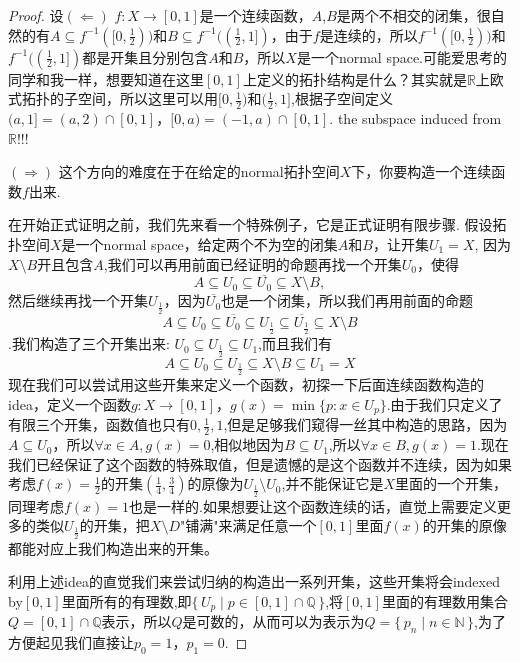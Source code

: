 \documentclass{article}
\newcommand*{\xfunc}[4]{{#2}\colon{#3}{#1}{#4}}
\newcommand*{\func}[3]{\xfunc{\to}{#1}{#2}{#3}}
\newcommand\Set[2]{\{\,#1\mid#2\,\}} %
\begin{document}
\begin{proof}
设$(\Leftarrow)$ $\func{f}{X}{[0,1]}$是一个连续函数，$A$,$B$是两个不相交的闭集，很自然的有$A \subseteq f^{-1}([0,\frac{1}{2}))$和$B \subseteq f^{-1}((\frac{1}{2},1])$，由于$f$是连续的，所以$f^{-1}([0,\frac{1}{2}))$和$f^{-1}((\frac{1}{2},1])$都是开集且分别包含$A$和$B$，所以$X$是一个normal space.可能爱思考的同学和我一样，想要知道在这里$[0,1]$上定义的拓扑结构是什么？其实就是$\mathbb{R}$上欧式拓扑的子空间，所以这里可以用$[0,\frac{1}{2})$和$(\frac{1}{2},1]$,根据子空间定义$(a,1]=(a,2)\cap[0,1]$，$[0,a)=(−1,a)∩[0,1]$. the subspace induced from $\mathbb{R}$!!! 

$(\Rightarrow)$ 这个方向的难度在于在给定的normal拓扑空间$X$下，你要构造一个连续函数$f$出来.

在开始正式证明之前，我们先来看一个特殊例子，它是正式证明有限步骤. 假设拓扑空间$X$是一个normal space，给定两个不为空的闭集$A$和$B$，让开集$U_1 = X$, 因为$X \setminus B$开且包含$A$,我们可以再用前面已经证明的命题再找一个开集$U_0$，使得\[A \subseteq U_0 \subseteq \overline{U_0} \subseteq X \setminus B,\]然后继续再找一个开集$U_{\frac{1}{2}}$，因为$\overline{U_0}$也是一个闭集，所以我们再用前面的命题\[A \subseteq U_0 \subseteq \overline{U_0} \subseteq U_{\frac{1}{2}} \subseteq \overline{U_{\frac{1}{2}}} \subseteq X \setminus B\].我们构造了三个开集出来: $U_0 \subseteq U_{\frac{1}{2}} \subseteq U_1$,而且我们有\[A \subseteq U_0 \subseteq U_{\frac{1}{2}} \subseteq X \setminus B \subseteq U_1 =X \]现在我们可以尝试用这些开集来定义一个函数，初探一下后面连续函数构造的idea，定义一个函数$\func{g}{X}{[0,1]}$，$g(x)=\min\{p \colon x \in U_p\}$.由于我们只定义了有限三个开集，函数值也只有$0,\frac{1}{2},1$,但是足够我们窥得一丝其中构造的思路，因为$A \subseteq U_0$，所以$\forall x \in A,g(x)=0$,相似地因为$B \subseteq U_1$,所以$\forall x \in B,g(x)=1$.现在我们已经保证了这个函数的特殊取值，但是遗憾的是这个函数并不连续，因为如果考虑$f(x)=\frac{1}{2}$的开集$(\frac{1}{4},\frac{3}{4})$的原像为$U_{\frac{1}{2}} \setminus U_0$,并不能保证它是$X$里面的一个开集，同理考虑$f(x)=1$也是一样的.如果想要让这个函数连续的话，直觉上需要定义更多的类似$U_{\frac{1}{2}}$的开集，把$X \setminus D$"铺满"来满足任意一个$[0,1]$里面$f(x)$的开集的原像都能对应上我们构造出来的开集。


利用上述idea的直觉我们来尝试归纳的构造出一系列开集，这些开集将会indexed by$[0,1]$里面所有的有理数,即$\Set{U_p}{p \in [0,1] \cap \mathbb{Q}}$,将$[0,1]$里面的有理数用集合$Q=[0,1] \cap \mathbb{Q}$表示，所以$Q$是可数的，从而可以为表示为$Q=\Set{p_n}{n \in \mathbb{N}}$,为了方便起见我们直接让$p_0 = 1$，$p_1 = 0$.


\end{proof}
\end{document}
